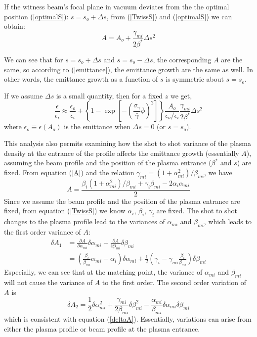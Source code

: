 \documentclass[%
reprint, superscriptaddress,
 amsmath,amssymb, aps,
prstab,
]{revtex4-2}
\begin{document}
If the witness beam's focal plane in vacuum deviates from the the optimal position (\ref{optimalS}): $s = s_o + \Delta s$, from (\ref{TwissS}) and (\ref{optimalS}) we can obtain:
\[
A= A_o + \frac{\gamma_{mi}}{2 \beta^*} \Delta s^2
\]


We can see that for $s = s_o + \Delta s$ and $s = s_o - \Delta s$, the corresponding $A$ are the same, so according to (\ref{emittance}), the emittance growth are the same as well. In other words, the emittance growth as a function of $s$ is symmetric about $s=s_o$.

If we assume $\Delta s$ is a small quantity, then for a fixed $z$ we get,
\[
\frac{\epsilon}{\epsilon_i} \approx \frac{\epsilon_o}{\epsilon_i} + \left \{1 - \exp[-(\frac{\sigma_\gamma}{\bar \gamma}\bar \phi)^2] \right \}\frac{A_o}{\epsilon_o / \epsilon_i} \frac{\gamma_{mi}}{2\beta^*}\Delta s^2
\]
where $\epsilon_o \equiv \epsilon(A_o)$ is the emittance when $\Delta s = 0$ (or $s = s_o$). 

This analysis also permits examining how the shot to shot variance of the plasma density at the entrance of the profile affects the emittance growth (essentially $A$), assuming the beam profile and the position of the plasma entrance ($\beta^*$ and $s$) are fixed. From equation (\ref{A}) and the relation $\gamma_{mi} = (1 + \alpha_{mi}^2) / \beta_{mi}$, we have
\[
A = \frac{\beta_i (1 + \alpha_{mi}^2) / \beta_{mi}+\gamma_i \beta_{mi}-2\alpha_i \alpha_{mi}}{2} 
\]
Since we assume the beam profile and the position of the plasma entrance are fixed, from equation (\ref{TwissS}) we know $\alpha_i$, $\beta_i$, $\gamma_i$ are fixed. The shot to shot changes to the plasma profile lead to the variances of $\alpha_{mi}$ and $\beta_{mi}$, which leads to the first order variance of $A$:
\begin{equation}
\begin{aligned}
\delta A_1 &= \frac{\partial A}{\partial \alpha_{mi}} \delta \alpha_{mi} + \frac{\partial A}{\partial \beta_{mi}} \delta \beta_{mi} 
\\
&= (\frac{\beta_i}{\beta_{mi}}\alpha_{mi} - \alpha_i) \delta \alpha_{mi} + \frac{1}{2} (\gamma_i - \gamma_{mi}\frac{\beta_i}{\beta_{mi}})\delta \beta_{mi}
\end{aligned}
\end{equation}
Especially, we can see that at the matching point, the variance of $\alpha_{mi}$ and $\beta_{mi}$ will not cause the variance of $A$ to the first order. The second order variation of $A$ is 
\[
\delta A_2 = \frac{1}{2} \delta \alpha_{mi}^2 + \frac{\gamma_{mi}}{2\beta_{mi}} \delta \beta_{mi}^2 - \frac{\alpha_{mi}}{\beta_{mi}} \delta \alpha_{mi} \delta \beta_{mi}
\]
which is consistent with equation (\ref{deltaA}). Essentially, variations can arise from either the plasma profile or beam profile at the plasma entrance.
\end{document}
